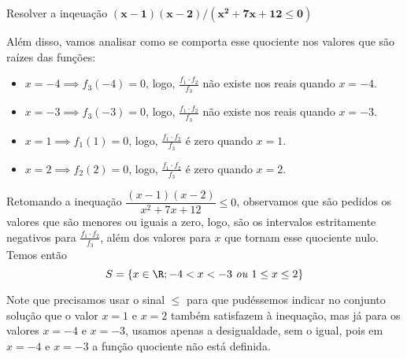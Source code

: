 \begin{example}{Resolver a inqeuação $\bm{(x-1)(x-2)/(x^2+7x+12\leq0)}$}
\begin{multicols}{5}
\end{multicols}

Além disso, vamos analisar como se comporta esse quociente nos valores que são raízes das funções:
\begin{itemize}
\item $x=-4 \implies f_3(-4) = 0$, logo, $\frac{f_1\cdot f_2}{f_3}$ não existe nos reais quando $x=-4$.
\item $x=-3 \implies f_3(-3) = 0$, logo, $\frac{f_1\cdot f_2}{f_3}$ não existe nos reais quando $x=-3$.
\item $x=1 \implies f_1(1) = 0$, logo, $\frac{f_1\cdot f_2}{f_3}$ é zero quando $x=1$.
\item $x=2 \implies f_2(2) = 0$, logo, $\frac{f_1\cdot f_2}{f_3}$ é zero quando $x=2$.
\end{itemize}

Retomando a inequação $\dfrac{(x-1)(x-2)}{x^2+7x+12}\leq0$, observamos que são pedidos os valores que são menores ou iguais a zero, logo, são os intervalos estritamente negativos para $\frac{f_1\cdot f_2}{f_3}$, além dos valores para $x$ que tornam esse quociente nulo. Temos então 
\begin{equation*}
S=\{x\in\R;-4<x<-3\text{ \textit{ou} }1\leq x\leq2\}
\end{equation*}
\end{example}

\begin{observation}{}
Note que precisamos usar o sinal $\leq$ para que pudéssemos indicar no conjunto solução que o valor $x=1$ e $x=2$ também satisfazem à inequação, mas já para os valores $x=-4$ e $x=-3$, usamos apenas a desigualdade, sem o igual, pois em $x=-4$ e $x=-3$ a função quociente não está definida.
\end{observation}

